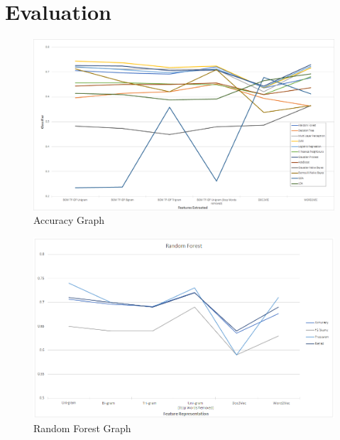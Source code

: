 \chapter{Evaluation}

\begin{figure}[h!]
\centering
\includegraphics[width=1\textwidth]{evaluation/accuracy_graph.png}
\caption{\label{fig:accuracy} Accuracy Graph}
\end{figure}

\begin{figure}[h!]
\centering
\includegraphics[width=1\textwidth]{evaluation/random_forest_graph.png}
\caption{\label{graph:randomforest} Random Forest Graph}
\end{figure}

